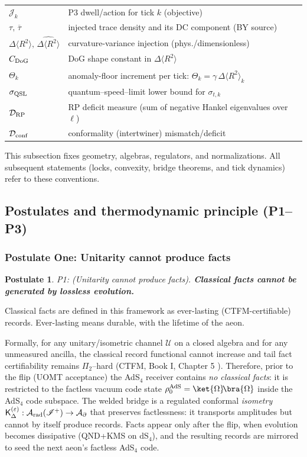 \documentclass[10pt]{article}
\theoremstyle{definition}
\theoremstyle{plain}
\newtheorem{postulate}{Postulate}[section]
\begin{document}
\begin{center}
\begin{tabular}{@{}ll@{}}
\(\mathcal J_k\) & P3 dwell/action for tick \(k\) (objective) \\
\(\tau,\,\overline{\tau}\) & injected trace density and its DC component (BY source) \\
\(\Delta\!\langle R^2\rangle,\,\widehat{\Delta\!\langle R^2\rangle}\) & curvature-variance injection (phys./dimensionless) \\
\(C_{\rm DoG}\) & DoG shape constant in \(\Delta\!\langle R^2\rangle\) \\
\(\Theta_k\) & anomaly-floor increment per tick: \(\Theta_k=\gamma\,\widehat{\Delta\!\langle R^2\rangle}_k\) \\
\(\sigma_{\rm QSL}\) & quantum–speed–limit lower bound for \(\sigma_{t,k}\) \\
\(\mathcal D_{\rm RP}\) & RP deficit measure (sum of negative Hankel eigenvalues over \(\ell\)) \\
\(\mathcal D_{\rm conf}\) & conformality (intertwiner) mismatch/deficit \\
\bottomrule
\end{tabular}
\end{center}

\medskip
This subsection fixes geometry, algebras, regulators, and normalizations. All subsequent statements (locks, convexity, bridge theorems, and tick dynamics) refer to these conventions.

\newpage
\subsection{Postulates and thermodynamic principle (P1–P3)}
\label{subsec:postulates-P1-P3}

\subsubsection*{Postulate One: Unitarity cannot produce facts}
\label{subsubsec:P1}
\begin{postulate}{P1: (Unitarity cannot produce facts).}
\label{post:P1}
\textbf{Classical facts cannot be generated by lossless evolution.}
\end{postulate}
Classical facts are defined in this framework as ever-lasting (CTFM-certifiable) records. Ever-lasting means durable, with the lifetime of the aeon.

Formally, for any unitary/isometric channel $\mathcal U$ on a closed algebra and for any
unmeasured ancilla, the classical record functional cannot increase and tail fact
certifiability remains $\Pi_2$–hard (CTFM, Book I, Chapter 5 \cite{CTFMBookIII}). Therefore, prior to the flip (UOMT acceptance)
the AdS$_4$ receiver contains \emph{no classical facts}: it is restricted to the
factless vacuum code state $\rho^{\rm AdS}_0=\ket{\Omega}\!\bra{\Omega}$ inside the AdS$_4$
code subspace. The welded bridge is a regulated conformal \emph{isometry}
${\sf K}^{(\varepsilon)}_\Delta:\mathcal A_{\rm rad}(\mathscr I^+)\to\mathcal A_\partial$
that preserves factlessness: it transports amplitudes but cannot by itself produce records.
Facts appear only after the flip, when evolution becomes dissipative (QND+KMS on dS$_4$),
and the resulting records are mirrored to seed the next aeon’s factless AdS$_4$ code.
\end{document}
